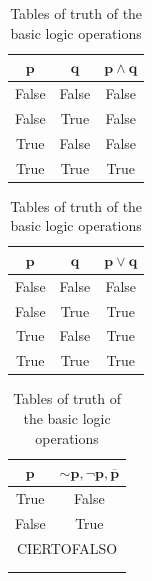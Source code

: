 \documentclass[a4paper]{article}
\begin{document}
\begin{table}[H]
    \centering
    \begin{subfigure}{0.33333\linewidth}
        \centering
        \begin{tabular}{|c|c|c|}
        \hline
        $\mathbf{p}$&$\mathbf{q}$&$\mathbf{p\land q}$\\\hline
        False & False  & False \\\hline
        False & True & False \\\hline
        True& False  & False \\\hline
        True& True & True\\\hline
        \end{tabular}
    \end{subfigure}%
    \begin{subfigure}{0.33333\linewidth}
        \centering
        \begin{tabular}{|c|c|c|}
        \hline
        $\mathbf{p}$&$\mathbf{q}$&$\mathbf{p \lor q}$\\\hline
        False & False  & False \\\hline
        False & True & True\\\hline
        True& False  & True\\\hline
        True& True & True\\\hline
        \end{tabular}
    \end{subfigure}%
    \begin{subfigure}{0.33333\linewidth}
        \centering
        \begin{tabular}{|c|c|}
        \hline
        $\mathbf{p}$&$\mathbf{\sim\!p}, \mathbf{\lnot p}, \mathbf{\overline{p}}$\\\hline
        True & False  \\\hline
        False & True \\\hline
        \multicolumn{2}{c}{\color{white}CIERTOFALSO\normalcolor}\\\arrayrulecolor{white}\hline
        \multicolumn{2}{c}{\color{white}CIERTOFALSO\normalcolor}\\\arrayrulecolor{white}\hline
        \end{tabular}
    \end{subfigure}
\caption{Tables of truth of the basic logic operations}
\label{tab:andTruthTable}
\end{table}
\end{document}

